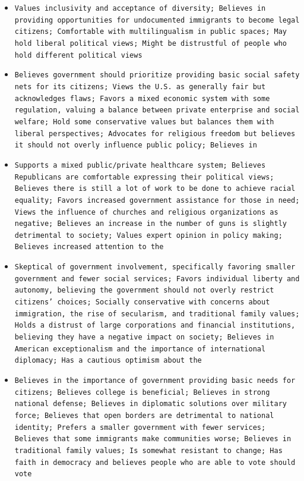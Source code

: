 \documentclass[11pt]{article}
\begin{document}
\begin{itemize}
\item \texttt{Values inclusivity and acceptance of diversity; Believes in providing opportunities for undocumented immigrants to become legal citizens; Comfortable with multilingualism in public spaces; May hold liberal political views; Might be distrustful of people who hold different political views}
\item \texttt{Believes government should prioritize providing basic social safety nets for its citizens; Views the U.S. as generally fair but acknowledges flaws; Favors a mixed economic system with some regulation, valuing a balance between private enterprise and social welfare; Hold some conservative values but balances them with liberal perspectives; Advocates for religious freedom but believes it should not overly influence public policy; Believes in}
\item \texttt{Supports a mixed public/private healthcare system; Believes Republicans are comfortable expressing their political views; Believes there is still a lot of work to be done to achieve racial equality; Favors increased government assistance for those in need; Views the influence of churches and religious organizations as negative; Believes an increase in the number of guns is slightly detrimental to society; Values expert opinion in policy making; Believes increased attention to the}
\item \texttt{Skeptical of government involvement, specifically favoring smaller government and fewer social services; Favors individual liberty and autonomy, believing the government should not overly restrict citizens' choices; Socially conservative with concerns about immigration, the rise of secularism, and traditional family values; Holds a distrust of large corporations and financial institutions, believing they have a negative impact on society; Believes in American exceptionalism and the importance of international diplomacy; Has a cautious optimism about the}
\item \texttt{Believes in the importance of government providing basic needs for citizens; Believes college is beneficial; Believes in strong national defense; Believes in diplomatic solutions over military force; Believes that open borders are detrimental to national identity; Prefers a smaller government with fewer services; Believes that some immigrants make communities worse; Believes in traditional family values; Is somewhat resistant to change; Has faith in democracy and believes people who are able to vote should vote}
\end{itemize}
\end{document}
